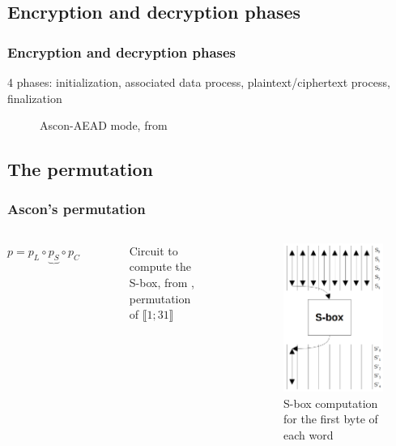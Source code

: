 \documentclass{beamer}
\begin{document}
	\subsection{Encryption and decryption phases}
	\begin{frame}
		\frametitle{Encryption and decryption phases}
		
		4 phases: initialization, associated data process, plaintext/ciphertext process, finalization
		
		\begin{figure}
			\centering
			\resizebox{350pt}{80pt}{
				
			}
			\caption{Ascon-AEAD mode, from \cite{cours_crypto}}
		\end{figure}	
	\end{frame}
	
	\subsection{The permutation}
	\begin{frame}
		\frametitle{Ascon's permutation}
		
		\begin{columns}
			\column{0.47\textwidth}
			$p = p_L \circ \underbrace{p_S}{} \circ p_C$\\
			\begin{figure}
				\resizebox*{150pt}{90pt}{
					
				}
				\caption{Circuit to compute the S-box, from \cite{crypto_schema}, permutation of $\llbracket1;31 \rrbracket$}
				\label{circuit_sbox}
			\end{figure}
			
			\column{0.47\textwidth}
			\begin{figure}[h]
				\centering
				\includegraphics[width=0.6\linewidth]{img_files/sbox_illustration}
				\caption{S-box computation for the first byte of each word}
				\label{fig:comp}
			\end{figure}

		\end{columns}
	\end{frame}
	
\end{document}

